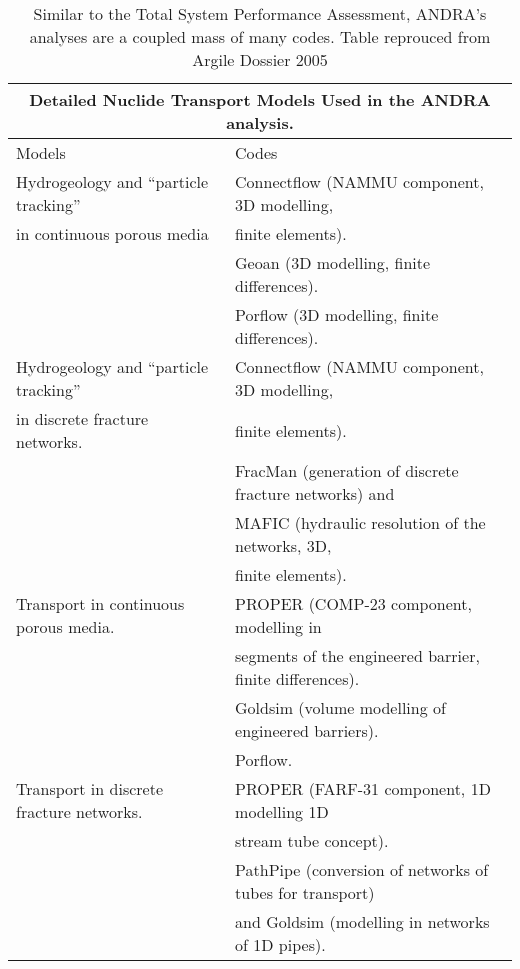 \begin{table}
\centering
\footnotesize{
\begin{tabular}{|l|l|}
  \multicolumn{2}{c}{\textbf{Detailed Nuclide Transport Models Used in the ANDRA analysis.}}\\
\hline
Models &                                          Codes\\
\hline
Hydrogeology and “particle tracking”    & Connectflow (NAMMU component, 3D modelling,\\
in continuous porous media              &  finite elements).\\
                                        &  Geoan (3D modelling, finite differences).\\
                                        &  Porflow (3D modelling, finite differences).\\
Hydrogeology and “particle tracking”    &  Connectflow (NAMMU component, 3D modelling,\\
in discrete fracture networks.          &  finite elements).\\
                                        &  FracMan (generation of discrete fracture networks) and\\
                                        &  MAFIC (hydraulic resolution of the networks, 3D,\\
                                        &  finite elements).\\
Transport in continuous porous media.   &  PROPER (COMP-23 component, modelling in\\
                                        &  segments of the engineered barrier, finite differences).\\
                                        &  Goldsim (volume modelling of engineered barriers).\\
                                        &  Porflow.\\
Transport in discrete fracture networks.&  PROPER (FARF-31 component, 1D modelling 1D\\
                                        &  stream tube concept).\\
                                        &  PathPipe (conversion of networks of tubes for transport)\\
                                        &  and Goldsim (modelling in networks of 1D pipes).\\
\hline
\end{tabular}
\caption[Particle Transport Codes Used in ANDRA Assessment]{Similar to the Total System Performance Assessment, ANDRA's analyses are a coupled mass of many codes. Table reprouced from Argile Dossier 2005 \cite{andra_argile:_2005}}
\label{tab:andra}
}
\end{table}
